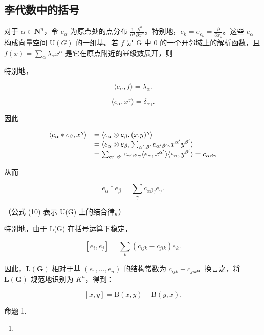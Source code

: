 \subsection{李代数中的括号}

对于 \(\alpha \in \mathbf{N}^n\)，令 \(e_{\alpha}\) 为原点处的点分布 \(\frac{1}{\alpha!} \frac{\partial^{\alpha}}{\partial x^{\alpha}}\)。特别地，\(e_k = e_{\varepsilon_k} = \frac{\partial}{\partial x_k}\)。这些 \(e_{\alpha}\) 构成向量空间 \(\mathrm{U}(G)\) 的一组基。若 \(f\) 是 G 中 0 的一个开邻域上的解析函数，且 \(f(x) = \sum_{\alpha} \lambda_{\alpha} x^{\alpha}\) 是它在原点附近的幂级数展开，则

特别地，

\[
\langle e _ {\alpha}, f \rangle = \lambda_ {\alpha}.
\]

\[
\langle e _ {\alpha}, x ^ {\gamma} \rangle = \delta_ {\alpha \gamma}.
\]

因此

\[
\begin{array}{r l} \langle e _ {\alpha} * e _ {\beta}, x ^ {\gamma} \rangle & = \langle e _ {\alpha} \otimes e _ {\beta}, (x. y) ^ {\gamma} \rangle \\ & = \langle e _ {\alpha} \otimes e _ {\beta}, \sum_ {\alpha^ {\prime}, \beta^ {\prime}} c _ {\alpha^ {\prime} \beta^ {\prime} \gamma} x ^ {\alpha^ {\prime}} y ^ {\beta^ {\prime}} \rangle \\ & = \sum_ {\alpha^ {\prime}, \beta^ {\prime}} c _ {\alpha^ {\prime} \beta^ {\prime} \gamma} \langle e _ {\alpha}, x ^ {\alpha^ {\prime}} \rangle \langle e _ {\beta}, y ^ {\beta^ {\prime}} \rangle = c _ {\alpha \beta \gamma} \end{array}
\]

从而

\[
e _ {\alpha} * e _ {\beta} = \sum_ {\gamma} c _ {\alpha \beta \gamma} e _ {\gamma}.\tag{11}
\]

（公式 (10) 表示 U(G) 上的结合律。）

特别地，由于 L(G) 在括号运算下稳定，

\[
[ e _ {i}, e _ {j} ] = \sum_ {k} (c _ {i j k} - c _ {j i k}) e _ {k}.\tag{12}
\]

因此，\(\mathbf{L}(\mathbf{G})\) 相对于基 \((e_{1},\ldots,e_{n})\) 的结构常数为 \(c_{ijk}-c_{jik}\)。换言之，将 \(\mathbf{L}(\mathbf{G})\) 规范地识别为 \(K^{n}\)，得到：

\[
[ x, y ] = \mathrm{B} (x, y) - \mathrm{B} (y, x).\tag{13}
\]

命题 1.

\begin{enumerate}
\def\labelenumi{(\roman{enumi})}
\tightlist
\item
\end{enumerate}


